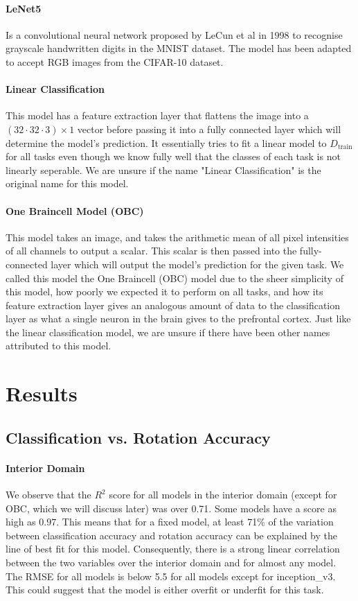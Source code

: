 \documentclass{article}
\begin{document}
\paragraph{LeNet5} Is a convolutional neural network proposed by LeCun et al in 1998 to recognise grayscale handwritten digits in the MNIST dataset. The model has been adapted to accept RGB images from the CIFAR-10 dataset.

\paragraph{Linear Classification} This model has a feature extraction layer that flattens the image into a $(32\cdot 32 \cdot 3) \times 1$ vector before passing it into a fully connected layer which will determine the model's prediction. It essentially tries to fit a linear model to $D_\text{train}$ for all tasks even though we know fully well that the classes of each task is not linearly seperable. We are unsure if the name "Linear Classification" is the original name for this model.

\paragraph{One Braincell Model (OBC)} This model takes an image, and takes the arithmetic mean of all pixel intensities of all channels to output a scalar. This scalar is then passed into the fully-connected layer which will output the model's prediction for the given task. We called this model the One Braincell (OBC) model due to the sheer simplicity of this model, how poorly we expected it to perform on all tasks, and how its feature extraction layer gives an analogous amount of data to the classification layer as what a single neuron in the brain gives to the prefrontal cortex. Just like the linear classification model, we are unsure if there have been other names attributed to this model.

\section{Results}
\subsection{Classification vs. Rotation Accuracy}
\paragraph{Interior Domain} We observe that the $R^2$ score for all models in the interior domain (except for OBC, which we will discuss later) was over 0.71. Some models have a score as high as $0.97$. This means that for a fixed model, at least 71\% of the variation between classification accuracy and rotation accuracy can be explained by the line of best fit for this model. Consequently, there is a strong linear correlation between the two variables over the interior domain and for almost any model. The RMSE for all models is below 5.5 for all models except for inception\_v3. This could suggest that the model is either overfit or underfit for this task.
\end{document}
